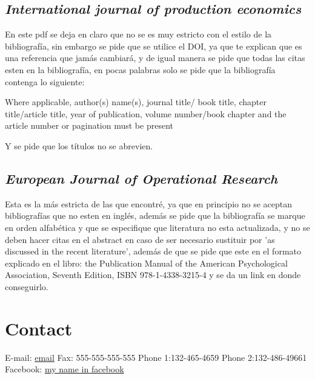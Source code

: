 \documentclass[letterpaper, 10 pt]{article}
\begin{document}
\subsection*{\textit{International journal of production economics}}

En este pdf se deja en claro que no se es muy estricto con el estilo de la bibliografía, sin embargo se pide que se utilice el DOI, ya que te explican que es una referencia que jamás cambiará, y de igual manera se pide que todas las citas esten en la bibliografía, en pocas palabras solo se pide que la bibliografía contenga lo siguiente:

\begin{center}
	Where applicable, author(s) name(s), journal title/
book title, chapter title/article title, year of publication, volume number/book chapter and the article
number or pagination must be present
\end{center}

Y se pide que los títulos no se abrevien.

\subsection*{\textit{European Journal of Operational Research }}
Esta es la más estricta de las que encontré, ya que en principio no se aceptan bibliografías que no esten en inglés, además se pide que la bibliografía se marque en orden alfabética y que se especifique que literatura no esta actualizada, y no se deben hacer citas en el abstract en caso de ser necesario sustituir por  'as discussed in the recent literature', además de que se pide que este en el formato explicado en el libro: the Publication Manual of the American Psychological Association, Seventh Edition, ISBN 978-1-4338-3215-4 y se da un link en donde conseguirlo.

\section*{Contact}


E-mail: \href{youremail@mail.com}{email} \newline
Fax: 555-555-555-555\newline
Phone 1:132-465-4659\newline
Phone 2:132-486-49661 \newline
Facebook: \href{https://www.facebook.com/}{my name in facebook}
\cite{HUANG2022108353}
\cite{QIU2022108362}
\newpage


\end{document}
